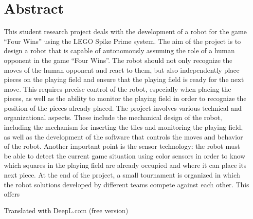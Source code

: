 \chapter*{Abstract} %
This student research project deals with the development of a robot for the game “Four Wins” using the LEGO Spike Prime system. The aim of the project is to design a robot that is capable of autonomously assuming the role of a human opponent in the game “Four Wins”. The robot should not only recognize the moves of the human opponent and react to them, but also independently place pieces on the playing field and ensure that the playing field is ready for the next move. This requires precise control of the robot, especially when placing the pieces, as well as the ability to monitor the playing field in order to recognize the position of the pieces already placed.
The project involves various technical and organizational aspects. These include the mechanical design of the robot, including the mechanism for inserting the tiles and monitoring the playing field, as well as the development of the software that controls the moves and behavior of the robot. Another important point is the sensor technology: the robot must be able to detect the current game situation using color sensors in order to know which squares in the playing field are already occupied and where it can place its next piece.
At the end of the project, a small tournament is organized in which the robot solutions developed by different teams compete against each other. This offers

Translated with DeepL.com (free version)
\clearpage